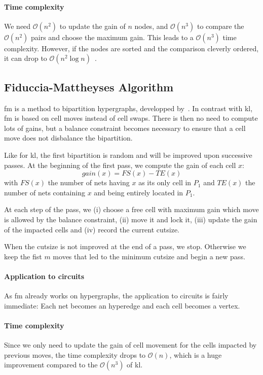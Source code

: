 \documentclass[11pt,a4paper]{report} %
\theoremstyle{customdef}
\begin{document}
\paragraph{Time complexity}
We need $\mathcal{O}(n^2)$ to update the gain of $n$ nodes, and $\mathcal{O}(n^3)$ to compare the $\mathcal{O}(n^2)$ pairs and choose the maximum gain.
This leads to a $\mathcal{O}(n^3)$ time complexity.
However, if the nodes are sorted and the comparison cleverly ordered, it can drop to $\mathcal{O}(n^2\log{}n)$~\citep*{Cormen2009, Dutt1993}.







\subsection{Fiduccia-Mattheyses Algorithm}
\gls{fm} is a method to bipartition hypergraphs, developped by~\citet{Fiduccia1982}.
In contrast with \gls{kl}, \gls{fm} is based on cell moves instead of cell swaps.
There is then no need to compute lots of gains, but a balance constraint becomes necessary to ensure that a cell move does not disbalance the bipartition.

Like for \gls{kl}, the first bipartition is random and will be improved upon successive passes.
At the beginning of the first pass, we compute the gain of each cell $x$: \[gain(x) = FS(x) - TE(x)\]
with $FS(x)$ the number of nets having $x$ as its only cell in $P_1$ and $TE(x)$ the number of nets containing $x$ and being entirely located in $P_1$.

At each step of the pass, we (i) choose a free cell with maximum gain which move is allowed by the balance constraint, (ii) move it and lock it, (iii) update the gain of the impacted cells and (iv) record the current cutsize.

When the cutsize is not improved at the end of a pass, we stop. Otherwise we keep the fist $m$ moves that led to the minimum cutsize and begin a new pass.


\paragraph{Application to circuits}
As \gls{fm} already works on hypergraphs, the application to circuits is fairly immediate: Each net becomes an hyperedge and each cell becomes a vertex.

\paragraph{Time complexity}
Since we only need to update the gain of cell movement for the cells impacted by previous moves, the time complexity drops to $\mathcal{O}(n)$, which is a huge improvement compared to the $\mathcal{O}(n^3)$ of \gls{kl}.
\end{document}
